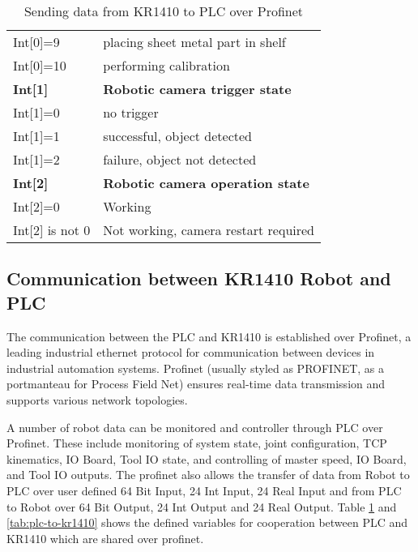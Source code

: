 \begin{table}[h]
\begin{tabular}{l@{\hskip 2cm}l}
      Int[0]=9 & placing sheet metal part in shelf\\
      Int[0]=10 & performing calibration\\
      \textbf{Int[1]} & \textbf{Robotic camera trigger state}\\
      Int[1]=0 & no trigger\\
      Int[1]=1 & successful, object detected\\
      Int[1]=2 & failure, object not detected\\
      \textbf{Int[2]} & \textbf{Robotic camera operation state}\\
      Int[2]=0 & Working\\
      Int[2] is not 0 & Not working, camera restart required\\
      \hline
  \end{tabular}
  \caption{Sending data from KR1410 to PLC over Profinet}
  \label{tab:kr1410-to-plc}
\end{table}

\subsection{Communication between KR1410 Robot and PLC}
The communication between the PLC and KR1410 is established over Profinet, a leading industrial ethernet protocol for communication between devices in industrial automation systems. Profinet (usually styled as PROFINET, as a portmanteau for Process Field Net) ensures real-time data transmission and supports various network topologies. \cite{profinet}

A number of robot data can be monitored and controller through PLC over Profinet. These include monitoring of system state, joint configuration,
TCP kinematics, IO Board, Tool IO state, and controlling of master speed, IO Board, and Tool IO outputs. The profinet also allows the transfer of
data from Robot to PLC over user defined 64 Bit Input, 24 Int Input, 24 Real Input and from PLC to Robot over 64 Bit Output, 24 Int Output and 24 Real Output. \cite{kr-profinet} Table \ref{tab:kr1410-to-plc} and \ref{tab:plc-to-kr1410} shows the defined variables for cooperation between PLC and KR1410 which are shared over profinet.

